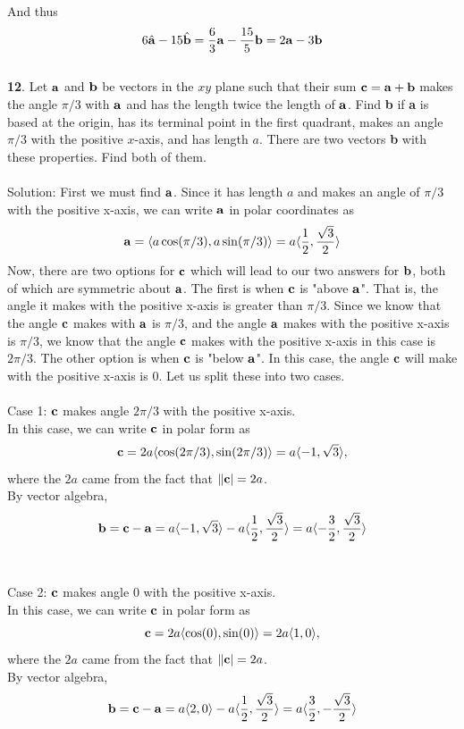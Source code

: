 \documentclass[12pt]{amsbook}
\newcommand{\la}{\langle}
\newcommand{\ra}{\rangle}
\begin{document}
And thus
$$6\hat{\bf a}-15\hat{\bf b}=\frac 63 {\bf a} - \frac {15}{5} {\bf b} = 2{\bf a} - 3{\bf b}$$
\\
{\small\bf 12}. Let ${\bf a}$ and ${\bf b}$ be 
vectors in the $xy$ plane
such that
their sum ${\bf c}={\bf a}+{\bf b}$ makes the 
angle $\pi/3$ with ${\bf a}$ and has the length 
twice the length of ${\bf a}$. Find {\bf b} if {\bf a} 
is based at the origin, 
has its terminal point in the first
quadrant, makes an angle $\pi/3$ with the positive $x$-axis,
and has length $a$. There are two vectors {\bf b} with these
properties. Find both of them.\\
\\
{\sc Solution}: First we must find $\bf a$. Since it has length $a$ and makes an angle of $\pi/3$ with the positive x-axis, we can write $\bf a$ in polar coordinates as
$${\bf a} = \la a\cos(\pi/3), a\sin(\pi/3) \ra = a\la \frac 12, \frac{\sqrt{3}}{2} \ra $$
Now, there are two options for $\bf c$ which will lead to our two answers for $\bf b$, both of which are symmetric about $\bf a$. The first is when $\bf c$ is "above $\bf a$". That is, the angle it makes with the positive x-axis is greater than $\pi/3$. Since we know that the angle $\bf c$ makes with $\bf a$ is $\pi/3$, and the angle $\bf a$ makes with the positive x-axis is $\pi/3$, we know that the angle $\bf c$ makes with the positive x-axis in this case is $2\pi/3$. The other option is when $\bf c$ is "below $\bf a$". In this case, the angle $\bf c$ will make with the positive x-axis is $0$. Let us split these into two cases.
\\
\\
Case 1: $\bf c$ makes angle $2\pi/3$ with the positive x-axis.
\\
In this case, we can write $\bf c$ in polar form as
$${\bf c}=2a \la \cos(2\pi/3),\sin(2\pi/3) \ra = a \la -1,\sqrt{3} \ra ,$$
where the $2a$ came from the fact that $\|{\bf c}|=2a$.
\\
By vector algebra,
$${\bf b}={\bf c}-{\bf a}=a \la -1, \sqrt{3} \ra - a\la \frac 12, \frac{\sqrt{3}}{2} \ra = a\la -\frac{3}{2}, \frac{\sqrt{3}}{2} \ra$$
\\
\\
Case 2: $\bf c$ makes angle $0$ with the positive x-axis.
\\
In this case, we can write $\bf c$ in polar form as
$${\bf c}=2a \la \cos(0),\sin(0) \ra = 2a \la 1,0 \ra ,$$
where the $2a$ came from the fact that $\|{\bf c}|=2a$.
\\
By vector algebra,
$${\bf b}={\bf c}-{\bf a}=a \la 2, 0 \ra - a\la \frac 12, \frac{\sqrt{3}}{2} \ra = a\la \frac{3}{2}, -\frac{\sqrt{3}}{2} \ra$$
\end{document}
